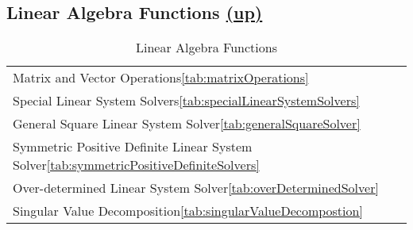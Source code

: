 \subsection*{Linear Algebra Functions \hyperlink{VSIPspecHead}{(up)}} 
\begin{table}[H]
\hypertarget{linearAlgebraFunctions}{}
\caption{Linear Algebra Functions}
\label{tab:linearAlgebraFunctions}
\begin{center}
\begin{tabular}{l}
Matrix and Vector Operations\ref{tab:matrixOperations}\\
Special Linear System Solvers\ref{tab:specialLinearSystemSolvers}\\
General Square Linear System Solver\ref{tab:generalSquareSolver}\\
Symmetric Positive Definite Linear System Solver\ref{tab:symmetricPositiveDefiniteSolvers}\\
Over-determined Linear System Solver\ref{tab:overDeterminedSolver}\\
Singular Value Decomposition\ref{tab:singularValueDecompostion}\\
\end{tabular}
\end{center}
\label{default}
\end{table}%